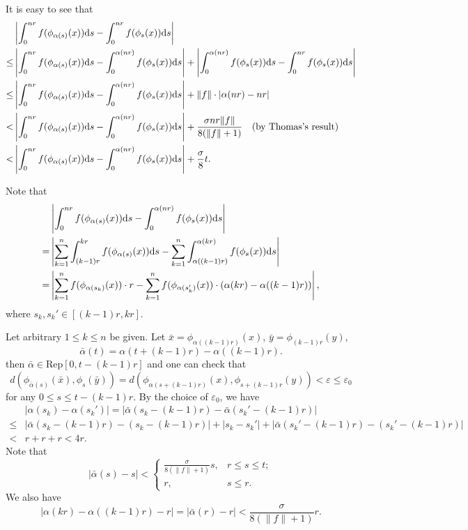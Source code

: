 \documentclass[10pt]{article}
\newtheorem*{Theorem A}{Theorem A}
\begin{document}
\noindent
It is easy to see that
\[
\begin{aligned}
&\left| \int_0^{nr} f(\phi_{\alpha(s)}(x)) {\rm d}s - \int_0^{nr} f(\phi_s(x)) {\rm d}s \right| \\
\leq& \left| \int_0^{nr} f(\phi_{\alpha(s)}(x)) {\rm d}s - \int_0^{\alpha(nr)} f(\phi_s(x)) {\rm d}s \right| + \left| \int_0^{\alpha(nr)} f(\phi_s(x)) {\rm d}s - \int_0^{nr} f(\phi_s(x)) {\rm d}s \right| \\
\leq &\left| \int_0^{nr} f(\phi_{\alpha(s)}(x)) {\rm d}s - \int_0^{\alpha(nr)} f(\phi_s(x)) {\rm d}s \right| + \|f\| \cdot |\alpha(nr) - nr| \\
<& \left| \int_0^{nr} f(\phi_{\alpha(s)}(x)) {\rm d}s - \int_0^{\alpha(nr)} f(\phi_s(x)) {\rm d}s \right| + \frac{\sigma nr \|f\|}{8(\|f\| + 1)} \quad (\text{by Thomas's result}) \\
<& \left| \int_0^{nr} f(\phi_{\alpha(s)}(x)) {\rm d}s - \int_0^{\alpha(nr)} f(\phi_s(x)) {\rm d}s \right| + \frac{\sigma}{8} t.
\end{aligned}
\]

\noindent
Note that
\[
\begin{aligned}
&\left| \int_0^{nr} f(\phi_{\alpha(s)}(x)) {\rm d}s - \int_0^{\alpha(nr)} f(\phi_s(x)) {\rm d}s \right| \\
=& \left| \sum_{k=1}^n \int_{(k-1)r}^{kr} f(\phi_{\alpha(s)}(x)) {\rm d}s - \sum_{k=1}^n \int_{\alpha((k-1)r)}^{\alpha(kr)} f(\phi_s(x)) {\rm d}s \right| \\
=& \left| \sum_{k=1}^n f(\phi_{\alpha(s_k)}(x)) \cdot r - \sum_{k=1}^n f(\phi_{\alpha(s_k')}(x)) \cdot (\alpha(kr) - \alpha((k-1)r)) \right|,
\end{aligned}
\]
where \( s_k, s_k' \in [(k-1)r, kr] \).

Let arbitrary $1\leq k\leq n$ be given. Let \( \bar{x} = \phi_{\alpha((k - 1)r)}(x) \), \( \bar{y} = \phi_{(k - 1)r}(y) \),
\[
\bar{\alpha}(t) = \alpha(t + (k - 1)r) - \alpha((k - 1)r).
\]
then \( \bar{\alpha} \in \text{Rep}[0, t - (k - 1)r] \) and one can check that
\[
d(\phi_{\bar{\alpha}(s)}(\bar{x}), \phi_s(\bar{y}))
= d\left( \phi_{\alpha(s + (k - 1)r)}(x), \phi_{s + (k - 1)r}(y) \right) < \varepsilon \leq \varepsilon_0
\]
for any \( 0 \leq s \leq t - (k - 1)r \). By the choice of \( \varepsilon_0 \), we have
\[
\begin{aligned}
&|\alpha(s_k) - \alpha(s_k')|
=|\bar{\alpha}(s_k - (k - 1)r) - \bar{\alpha}(s_k' - (k - 1)r)| \\
\leq& |\bar{\alpha}(s_k - (k - 1)r) - (s_k - (k - 1)r)| + |s_k - s_k'| + |\bar{\alpha}(s_k' - (k - 1)r) - (s_k' - (k - 1)r)| \\
<& r + r + r < 4r.
\end{aligned}
\]
Note that
\[
|\bar{\alpha}(s) - s| < \begin{cases} \frac{\sigma}{8(\|f\| + 1)} s, & r\leq s \leq t; \\ r, & s \leq r. \end{cases}
\]
We also have
\[
|\alpha(kr) - \alpha((k - 1)r) - r| = |\bar{\alpha}(r) - r| < \frac{\sigma}{8(\|f\| + 1)} r.
\]
\end{document}
